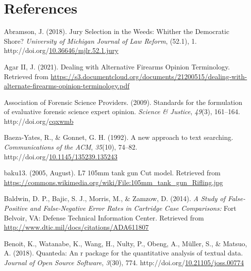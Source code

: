\documentclass[print]{nuthesis}
\newlength{\cslhangindent}
\newenvironment{CSLReferences}[2]%
{\setlength{\parindent}{0pt}%
\everypar{\setlength{\hangindent}{\cslhangindent}}\ignorespaces}%
{\par}
\begin{document}
\backmatter

\hypertarget{references}{%
\chapter*{References}\label{references}}

\noindent

\setlength{\parindent}{-0.20in}
\setlength{\leftskip}{0.20in}
\setlength{\parskip}{8pt}

\hypertarget{refs}{}
\begin{CSLReferences}{1}{0}
\leavevmode{}%
Abramson, J. (2018). Jury {Selection} in the {Weeds}: {Whither} the {Democratic} {Shore}? \emph{University of Michigan Journal of Law Reform}, (52.1), 1. http://doi.org/\href{https://doi.org/10.36646/mjlr.52.1.jury}{10.36646/mjlr.52.1.jury}

\leavevmode{}%
Agar II, J. (2021). Dealing with {Alternative} {Firearms} {Opinion} {Terminology}. Retrieved from \url{https://s3.documentcloud.org/documents/21200515/dealing-with-alternate-firearms-opinion-terminology.pdf}

\leavevmode{}%
Association of Forensic Science Providers. (2009). Standards for the formulation of evaluative forensic science expert opinion. \emph{Science \& Justice}, \emph{49}(3), 161--164. http://doi.org/\href{https://doi.org/cqxwmb}{cqxwmb}

\leavevmode{}%
Baeza-Yates, R., \& Gonnet, G. H. (1992). A new approach to text searching. \emph{Communications of the ACM}, \emph{35}(10), 74--82. http://doi.org/\href{https://doi.org/10.1145/135239.135243}{10.1145/135239.135243}

\leavevmode{}%
baku13. (2005, August). L7 105mm tank gun {Cut} model. Retrieved from \url{https://commons.wikimedia.org/wiki/File:105mm_tank_gun_Rifling.jpg}

\leavevmode{}%
Baldwin, D. P., Bajic, S. J., Morris, M., \& Zamzow, D. (2014). \emph{A {Study} of {False}-{Positive} and {False}-{Negative} {Error} {Rates} in {Cartridge} {Case} {Comparisons}:} Fort Belvoir, VA: Defense Technical Information Center. Retrieved from \url{http://www.dtic.mil/docs/citations/ADA611807}

\leavevmode{}%
Benoit, K., Watanabe, K., Wang, H., Nulty, P., Obeng, A., Müller, S., \& Matsuo, A. (2018). Quanteda: An r package for the quantitative analysis of textual data. \emph{Journal of Open Source Software}, \emph{3}(30), 774. http://doi.org/\href{https://doi.org/10.21105/joss.00774}{10.21105/joss.00774}


\end{CSLReferences}
\end{document}
